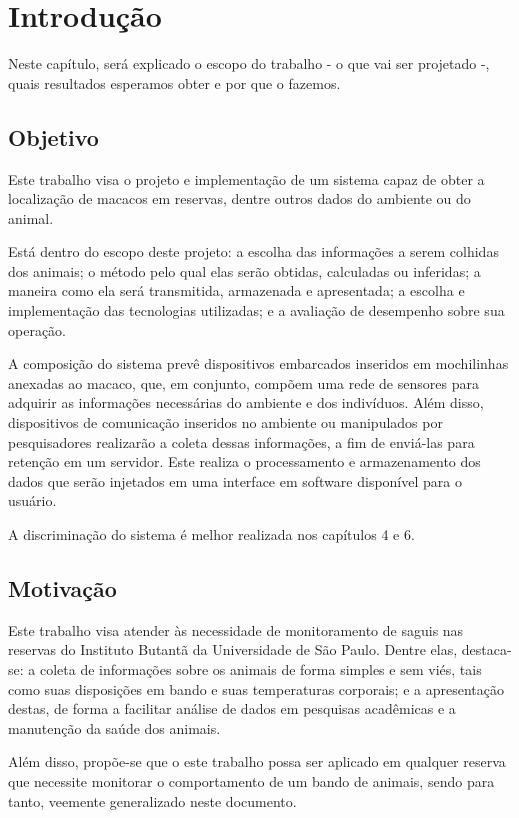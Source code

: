 \chapter{Introdução}
Neste capítulo, será explicado o escopo do trabalho - o que vai ser projetado -, quais resultados esperamos obter e por que o fazemos.
	
\section{Objetivo}
Este trabalho visa o projeto e implementação de um sistema capaz de obter a localização de macacos em reservas, dentre outros dados do ambiente ou do animal.

Está dentro do escopo deste projeto: a escolha das informações a serem colhidas dos animais; o método pelo qual elas serão obtidas, calculadas ou inferidas; a maneira como ela será transmitida, armazenada e apresentada; a escolha e implementação das tecnologias utilizadas; e a avaliação de desempenho sobre sua operação.

A composição do sistema prevê dispositivos embarcados inseridos em mochilinhas anexadas ao macaco, que, em conjunto, compõem uma rede de sensores para adquirir as informações necessárias do ambiente e dos indivíduos. Além disso, dispositivos de comunicação inseridos no ambiente ou manipulados por pesquisadores realizarão a coleta dessas informações, a fim de enviá-las para retenção em um servidor.  Este realiza o processamento e armazenamento dos dados que serão injetados em uma interface em software disponível para o usuário.

A discriminação do sistema é melhor realizada nos capítulos 4 e 6.

\section{Motivação}
Este trabalho visa atender às necessidade de monitoramento de saguis nas reservas do Instituto Butantã da Universidade de São Paulo. Dentre elas, destaca-se: a coleta de informações sobre os animais de forma simples e sem viés, tais como suas disposições em bando e suas temperaturas corporais; e a apresentação destas, de forma a facilitar análise de dados em  pesquisas acadêmicas e a manutenção da saúde dos animais.

Além disso, propõe-se que o este trabalho possa ser aplicado em qualquer reserva que necessite monitorar o comportamento de um bando de animais, sendo para tanto, veemente generalizado neste documento.

